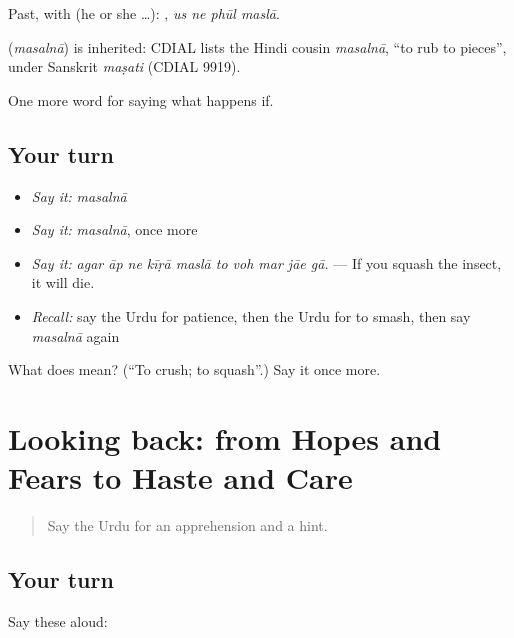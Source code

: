 Past, with  (he or she …):    , \emph{us ne phūl maslā}.

\begin{cousinweb}
\textbf{} (\emph{masalnā}) is inherited: CDIAL lists the Hindi cousin \emph{masalnā}, \textquotedblleft{}to rub to pieces\textquotedblright{}, under Sanskrit \emph{maṣati} (CDIAL 9919).
\end{cousinweb}

\begin{grammarlens}[title={What you've built}]
One more word for saying what happens if.
\end{grammarlens}

\subsection*{Your turn}
\begin{itemize}
\raggedright
  \item \emph{Say it:} \emph{masalnā}
  \item \emph{Say it:} \emph{masalnā}, once more
  \item \emph{Say it:} \emph{agar āp ne kīṛā maslā to voh mar jāe gā.} — If you squash the insect, it will die.
  \item \emph{Recall:} say the Urdu for patience, then the Urdu for to smash, then say \emph{masalnā} again
\end{itemize}

\begin{tcolorbox}[breakable,colback=teal!4,colframe=teal!35!black,title={Before you move on}]
What does  mean? (\textquotedblleft{}To crush; to squash\textquotedblright{}.) Say it once more.
\end{tcolorbox}
\section[(dialogue)]{Looking back: from Hopes and Fears to Haste and Care}

\label{lesson:UR-R370-review-363-370}



\begin{quote}
Say the Urdu for an apprehension and a hint.
\end{quote}

\subsection*{Your turn}
Say these aloud:

